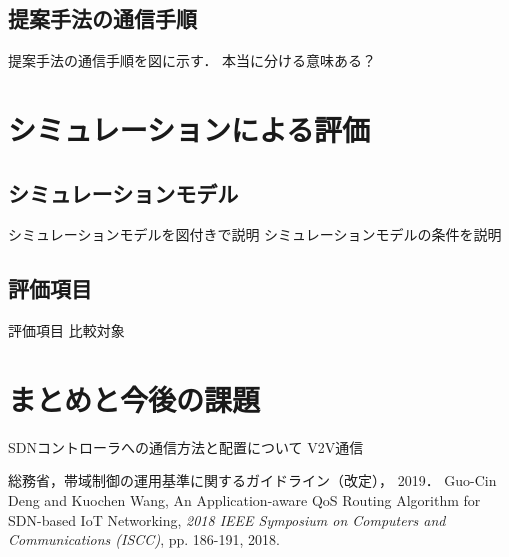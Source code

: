\documentclass[a4paper,10pt,twocolumn,uplatex]{jsarticle}
\begin{document}
\subsection{提案手法の通信手順}
提案手法の通信手順を図に示す．
本当に分ける意味ある？

\section{シミュレーションによる評価}
\subsection{シミュレーションモデル}
シミュレーションモデルを図付きで説明
シミュレーションモデルの条件を説明

\subsection{評価項目}
評価項目
比較対象

\section{まとめと今後の課題}
SDNコントローラへの通信方法と配置について
V2V通信

\footnotesize{
  \begin{thebibliography}{99}
     総務省，帯域制御の運用基準に関するガイドライン（改定）， 2019．
     Guo-Cin Deng and Kuochen Wang, An Application-aware QoS Routing Algorithm for SDN-based IoT Networking, \textit{2018 IEEE Symposium on Computers and Communications (ISCC)}, pp. 186-191, 2018.
  \end{thebibliography}
}

% 
% 

\end{document}
